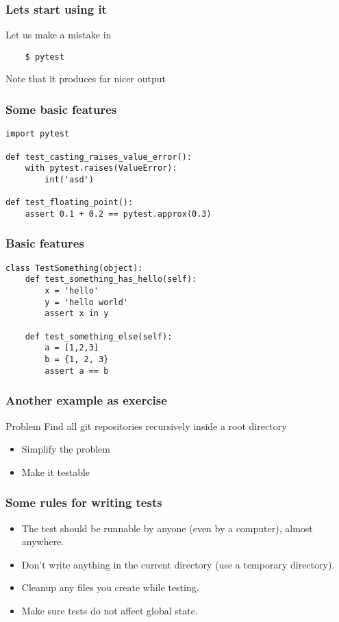 \documentclass[14pt,compress]{beamer}
\begin{document}
\begin{frame}[fragile]
  \frametitle{Lets start using it}
  Let us make a mistake in 
  \begin{lstlisting}
    $ pytest
  \end{lstlisting}%
  Note that it produces far nicer output
\end{frame}

\begin{frame}[fragile]
  \frametitle{Some basic features}
\small
  \begin{lstlisting}
import pytest

def test_casting_raises_value_error():
    with pytest.raises(ValueError):
        int('asd')

def test_floating_point():
    assert 0.1 + 0.2 == pytest.approx(0.3)
  \end{lstlisting}
\end{frame}

\begin{frame}[fragile]
  \frametitle{Basic features}
\small
  \begin{lstlisting}
class TestSomething(object):
    def test_something_has_hello(self):
        x = 'hello'
        y = 'hello world'
        assert x in y

    def test_something_else(self):
        a = [1,2,3]
        b = {1, 2, 3}
        assert a == b
\end{lstlisting}
\end{frame}

\begin{frame}
  \frametitle{Another example as exercise}
  \begin{block}{Problem}
  Find all git repositories recursively inside a root directory
\end{block}
\pause
\begin{itemize}
\item Simplify the problem
\item Make it testable
\end{itemize}
\end{frame}

\begin{frame}
  \frametitle{Some rules for writing tests}
  \begin{itemize}
  \item The test should be runnable by anyone (even by a computer), almost anywhere.
  \item Don't write anything in the current directory (use a temporary directory).
  \item Cleanup any files you create while testing.
  \item Make sure tests do not affect global state.
  \end{itemize}
\end{frame}
\end{document}
